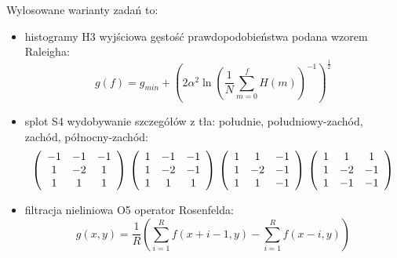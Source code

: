 \documentclass{classrep}
\begin{document}
Wylosowane warianty zadań to:
\begin{itemize}
 \item histogramy H3 \ppauza wyjściowa gęstość prawdopodobieństwa podana wzorem Raleigha:
  \begin{equation*}
   g(f) = g_{min} + \left(2 \alpha^2 \ln \left(\frac{1}{N} \displaystyle\sum\limits_{m=0}^f H\left(m\right)\right)^{-1}\right)^{\frac{1}{2}}
  \end{equation*}
 \item splot S4 \ppauza wydobywanie szczegółów z tła: południe, południowy-zachód, zachód, północny-zachód:
\begin{equation*}
\left(\begin{array}{ccc} -1 & -1 & -1 \\
1 & -2 & 1 \\
1 & 1 & 1 \\
\end{array}\right)\\
\\
\left(\begin{array}{ccc} 1 & -1 & -1 \\
1 & -2 & -1 \\
1 & 1 & 1 \\
\end{array}\right)\\
\\
\left(\begin{array}{ccc} 1 & 1 & -1 \\
1 & -2 & -1 \\
1 & 1 & -1 \\
\end{array}\right)\\
\\
\left(\begin{array}{ccc} 1 & 1 & 1 \\
1 & -2 & -1 \\
1 & -1 & -1 \\
\end{array}\right)
\end{equation*}
  \item filtracja nieliniowa O5 \ppauza operator Rosenfelda:
\begin{equation*}
 g(x, y) = \frac{1}{R} \left( \displaystyle \sum \limits_{i=1}^R f\left(x + i - 1, y\right) - \displaystyle \sum \limits_{i=1}^R f \left(x - i, y\right) \right)
\end{equation*}
\end{itemize}
\end{document}
